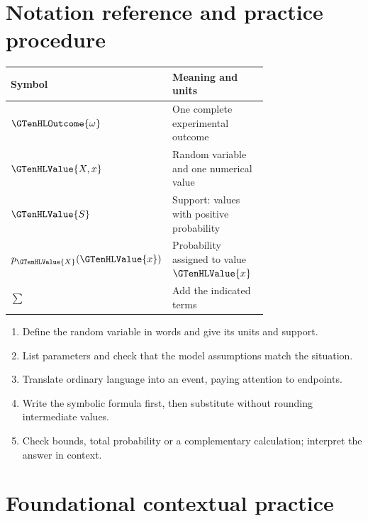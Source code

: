 

\section{Notation reference and practice procedure}\label{sec:t2-c1-notation-and-procedure}


\label{subsec:t2-c1-notation-reference}
\begin{center}
\begin{tabular}{lp{0.72\linewidth}}
\toprule
Symbol & Meaning and units \\ \midrule
$\GTenHLOutcome{\omega}$ & One complete experimental outcome \\
$\GTenHLValue{X,x}$ & Random variable and one numerical value \\
$\GTenHLValue{S}$ & Support: values with positive probability \\
$p_{\GTenHLValue{X}}(\GTenHLValue{x})$ & Probability assigned to value $\GTenHLValue{x}$ \\
$\sum$ & Add the indicated terms \\
\bottomrule
\end{tabular}
\end{center}
\label{subsec:t2-c1-practice-procedure}
\begin{enumerate}
\item Define the random variable in words and give its units and support.
\item List parameters and check that the model assumptions match the situation.
\item Translate ordinary language into an event, paying attention to endpoints.
\item Write the symbolic formula first, then substitute without rounding intermediate values.
\item Check bounds, total probability or a complementary calculation; interpret the answer in context.
\end{enumerate}
\section{Foundational contextual practice}\label{sec:t2-c1-foundational}

